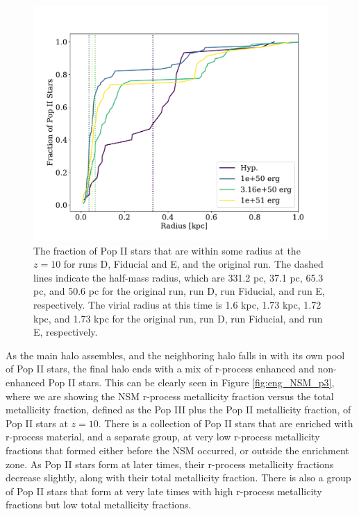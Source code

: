 \documentclass[fleqn,usenatbib]{mnras}
\begin{document}
\begin{figure} 
	\includegraphics[width=\columnwidth]{plots/eng_stellar_dist.pdf}
	\caption[Radial distribution of Pop II stars for each explosion energy variation run.]{The fraction of Pop II stars that are within some radius at the $z = 10$ for runs D, Fiducial and E, and the original run. The dashed lines indicate the half-mass radius, which are 331.2 pc, 37.1 pc, 65.3 pc, and 50.6 pc for the original run, run D, run Fiducial, and run E, respectively. The virial radius at this time is 1.6 kpc, 1.73 kpc, 1.72 kpc, and 1.73 kpc for the original run, run D, run Fiducial, and run E, respectively.}
	\label{fig:eng_stellar_dist}
\end{figure}

As the main halo assembles, and the neighboring halo falls in with its own pool of Pop II stars, the final halo ends with a mix of r-process enhanced and non-enhanced Pop II stars. This can be clearly seen in Figure \ref{fig:eng_NSM_p3}, where we are showing the NSM r-process metallicity fraction versus the total metallicity fraction, defined as the Pop III plus the Pop II metallicity fraction, of Pop II stars at $z = 10$. There is a collection of Pop II stars that are enriched with r-process material, and a separate group, at very low r-process metallicity fractions that formed either before the NSM occurred, or outside the enrichment zone. As Pop II stars form at later times, their r-process metallicity fractions decrease slightly, along with their total metallicity fraction. There is also a group of Pop II stars that form at very late times with high r-process metallicity fractions but low total metallicity fractions. 
 
\end{document}
